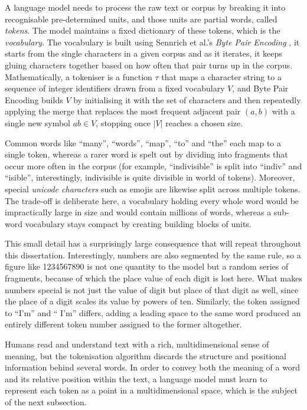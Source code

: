 A language model needs to process the raw text or corpus by breaking it into recognisable pre-determined units, and those units are partial words, called \emph{tokens}. The model maintains a fixed dictionary of these tokens, which is the \emph{vocabulary}. The vocabulary is built using Sennrich et al.'s \emph{Byte Pair Encoding} \cite{sennrich2016neuralmachinetranslationrare}, it starts from the single characters in a given corpus and as it iterates, it keeps gluing characters together based on how often that pair turns up in the corpus. Mathematically, a tokeniser is a function $\tau$ that maps a character string to a sequence of integer identifiers drawn from a fixed vocabulary $V$, and Byte Pair Encoding builds $V$ by initialising it with the set of characters and then repeatedly applying the merge that replaces the most frequent adjacent pair $(a,b)$ with a single new symbol $ab \in V$, stopping once $|V|$ reaches a chosen size.

Common words like ``many'', ``words'', ``map'', ``to'' and ``the'' each map to a single token, whereas a rarer word is spelt out by dividing into fragments that occur more often in the corpus (for example, ``indivisible'' is split into ``indiv'' and ``isible'', interestingly, indivisible is quite divisible in world of tokens). Moreover, special \emph{unicode characters} such as emojis are likewise split across multiple tokens. The trade-off is deliberate here, a vocabulary holding every whole word would be impractically large in size and would contain millions of words, whereas a sub-word vocabulary stays compact by creating building blocks of units.

This small detail has a surprisingly large consequence that will repeat throughout this dissertation. Interestingly, numbers are also segmented by the same rule, so a figure like 1234567890 is not one quantity to the model but a random series of fragments, because of which the place value of each digit is lost here. What makes numbers special is not just the value of digit but place of that digit as well, since the place of a digit scales its value by powers of ten. Similarly, the token assigned to ``I'm'' and `` I'm'' differs, adding a leading space to the same word produced an entirely different token number assigned to the former altogether.

Humans read and understand text with a rich, multidimensional sense of meaning, but the tokenisation algorithm discards the structure and positional information behind several words. In order to convey both the meaning of a word and its relative position within the text, a language model must learn to represent each token as a point in a multidimensional space, which is the subject of the next subsection.


